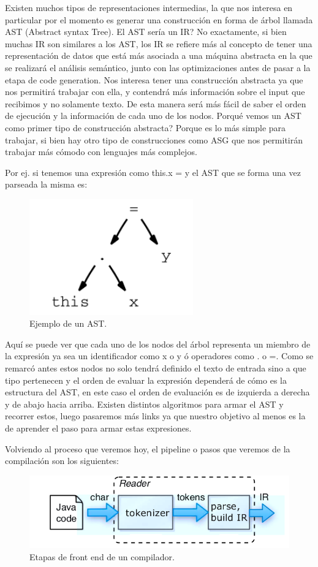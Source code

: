 \documentclass[fleqn]{tcdl}
\begin{document}
Existen muchos tipos de representaciones intermedias, la que nos interesa en particular por el momento es generar una construcción en forma de árbol llamada AST (Abstract syntax Tree). El AST sería un IR? No exactamente, si bien muchas IR son similares a los AST, los IR se refiere más al concepto de tener una representación de datos que está más asociada a una máquina abstracta en la que se realizará el análisis semántico, junto con las optimizaciones antes de pasar a la etapa de code generation. Nos interesa tener una construcción abstracta ya que nos permitirá trabajar con ella, y contendrá más información sobre el input que recibimos y no solamente texto. De esta manera será más fácil de saber el orden de ejecución y la información de cada uno de los nodos. Porqué vemos un AST como primer tipo de construcción abstracta? Porque es lo más simple para trabajar, si bien hay otro tipo de construcciones como ASG que nos permitirán trabajar más cómodo con lenguajes más complejos.

Por ej. si tenemos una expresión como this.x = y el AST que se forma una vez parseada la misma es:

\begin{figure}[h]
\captionsetup{type=figure}
\includegraphics[width=200pt]{ast1.png}
\caption{\label{fig:comp_basic}Ejemplo de un AST.}
\end{figure}

Aquí se puede ver que cada uno de los nodos del árbol representa un miembro de la expresión ya sea un identificador como x o y ó operadores como . o =. Como se remarcó antes estos nodos no solo tendrá definido el texto de entrada sino a que tipo pertenecen y el orden de evaluar la expresión dependerá de cómo es la estructura del AST, en este caso el orden de evaluación es de izquierda a derecha y de abajo hacia arriba. Existen distintos algoritmos para armar el AST y recorrer estos, luego pasaremos más links ya que nuestro objetivo al menos es la de aprender el paso para armar estas expresiones.

Volviendo al proceso que veremos hoy, el pipeline o pasos que veremos de la compilación son los siguientes:

\begin{figure}[h]
\captionsetup{type=figure}
\includegraphics[width=\textwidth]{frontend1.png}
\caption{\label{fig:comp_basic}Etapas de front end de un compilador.}
\end{figure}
\end{document}
